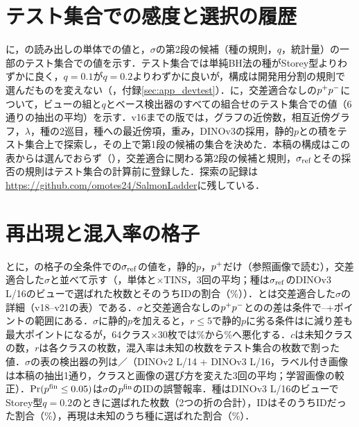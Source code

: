\section{テスト集合での感度と選択の履歴}
\label{sec:app_sens}
に，の読み出しの単体での値と，$\sigma$の第2段の候補（種の規則，$q$，統計量）の一部のテスト集合での値を示す．テスト集合では単純BH法の種がStorey型よりわずかに良く，$q{=}0.1$が$q{=}0.2$よりわずかに良いが，構成は開発用分割の規則で選んだものを変えない（，付録\ref{sec:app_devtest}）．に，交差適合なしの$\pP\pN$について，ビューの組と$q$とベース検出器のすべての組合せのテスト集合での値（6通りの抽出の平均）を示す．v16までの版では，グラフの近傍数，相互近傍グラフ，$\lambda$，種の2巡目，種への最近傍項，重み，DINOv3の採用，静的$p$との積をテスト集合上で探索し，その上で第1段の候補の集合を決めた．本稿の構成はこの表からは選んでおらず（），交差適合に関わる第2段の候補と規則，$\sigma_{\mathrm{ref}}$とその採否の規則はテスト集合の計算前に登録した．探索の記録は\url{https://github.com/omotes24/SalmonLadder}に残している．

\begin{table}[htbp]
\centering
\caption{同じ特徴での読み出しの比較（単体）と$\sigma$の第2段の他の候補の値（[\%]，6通りの抽出の平均）．記法はと同じ．}
\label{tab:ablx}
\vspace{1.5mm}

\end{table}

\begin{table}[htbp]
\centering
\caption{テスト集合での感度（[\%]，交差適合なしの$\pP\pN$，6通りの抽出の平均）．\textcolor{sotacol}{$\bigstar$}は列の最良値．}
\label{tab:sens}
\vspace{1.5mm}

\end{table}

\section{再出現と混入率の格子}
\label{sec:app_rec}
とに，の格子の全条件での$\sigma_{\mathrm{ref}}$の値を，静的$p$，$p^{+}$だけ（参照画像で読む），交差適合した$\sigma$と並べて示す（\FPR{}，単体と$\times$TINS，3回の平均；種は$\sigma_{\mathrm{ref}}$のDINOv3 L/16のビューで選ばれた枚数とそのうちIDの割合（\%））．とは交差適合した$\sigma$の詳細（v18--v21の表）である．$\sigma$と交差適合なしの$\pP\pN$との\FPR{}の差は\NRecNAll{}条件で\NRecMinMainMinusVOne{}--+\NRecMaxMainMinusVOne{}ポイントの範囲にある．$\sigma$に静的$p$を加えると，$r\le5$で静的$p$に劣る条件は\NRecNRLeFivePpsWorseStatic{}に減り差も最大\NRecMaxPpsMinusStaticLeFive{}ポイントになるが，64クラス$\times$30枚では\NRecNincoCSixFourRThreeZeroMainFpr\%から\NRecNincoCSixFourRThreeZeroPpsFpr\%へ悪化する．$c$は未知クラスの数，$r$は各クラスの枚数，混入率は未知の枚数をテスト集合の枚数で割った値．$\sigma$の表の検出器の列は\AUC{}／\FPR{}（DINOv2 L/14 + DINOv3 L/16，ラベル付き画像は本稿の抽出1通り，クラスと画像の選び方を変えた3回の平均；学習画像の較正）．$\Pr(p^{\mathrm{fin}}\le0.05)$は$\sigma$の$p^{\mathrm{fin}}$のIDの誤警報率．種はDINOv3 L/16のビューでStorey型$q{=}0.2$のときに選ばれた枚数（2つの折の合計），IDはそのうちIDだった割合（\%），再現は未知のうち種に選ばれた割合（\%）．


